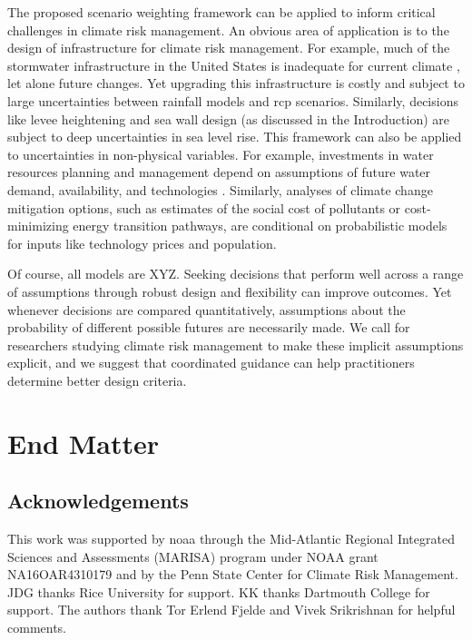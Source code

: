 \documentclass[11pt]{article}
\newcommand{\james}[1]{\todo[color=giallo, textcolor=nero]{\textbf{ATTN James:~}#1}} %
\begin{document}
The proposed scenario weighting framework can be applied to inform critical challenges in climate risk management.
An obvious area of application is to the design of infrastructure for climate risk management.
For example, much of the stormwater infrastructure in the United States is inadequate for current climate \citep{lopez-cantu:2018}, let alone future changes.
Yet upgrading this infrastructure is costly and subject to large uncertainties between rainfall models \citep{sharma_rcp:2021} and \gls{rcp} scenarios.
Similarly, decisions like  levee heightening \citep{garner_slrise:2018,oddo_coastal:2017,vandantzig_dike:1956} and sea wall design (as discussed in the Introduction) are subject to deep uncertainties in sea level rise.
This framework can also be applied to uncertainties in non-physical variables.
For example, investments in water resources planning and management depend on assumptions of future water demand, availability, and technologies \citep{trindade_deeplyuncertainpathways:2019}.
Similarly, analyses of climate change mitigation options, such as estimates of the social cost of pollutants \citep{errickson_methane:2021} or cost-minimizing energy transition pathways, are conditional on probabilistic models for inputs like technology prices and population.

Of course, all models are XYZ.\james{Get feedback from Klaus here}
Seeking decisions that perform well across a range of assumptions through robust design and flexibility can improve outcomes.
Yet whenever decisions are compared quantitatively, assumptions about the probability of different possible futures are necessarily made.
We call for researchers studying climate risk management to make these implicit assumptions explicit, and we suggest that coordinated guidance can help practitioners determine better design criteria.

\section*{End Matter}

\subsection*{Acknowledgements}

This work was supported by \acrfull{noaa} through the Mid-Atlantic Regional Integrated Sciences and Assessments (MARISA) program under NOAA grant NA16OAR4310179 and by the Penn State Center for Climate Risk Management.
JDG thanks Rice University for support.
KK thanks Dartmouth College for support.
The authors thank Tor Erlend Fjelde and Vivek Srikrishnan for helpful comments.
\end{document}
